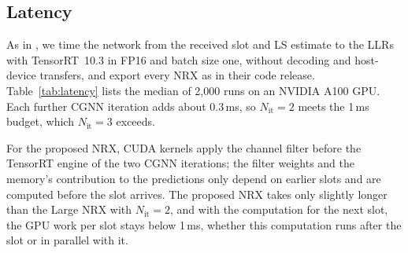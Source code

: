 \subsection{Latency}
As in \citet{wiesmayr2025realtime}, we time the network from the received slot and LS estimate to the LLRs with TensorRT~10.3 in FP16 and batch size one, without decoding and host-device transfers, and export every NRX as in their code release. Table~\ref{tab:latency} lists the median of 2{,}000 runs on an NVIDIA A100 GPU. Each further CGNN iteration adds about 0.3\,ms, so $N_{\mathrm{it}}=2$ meets the 1\,ms budget, which $N_{\mathrm{it}}=3$ exceeds.

\begin{table}[t]
\centering
\caption{Median latency [ms] with TensorRT on an NVIDIA A100 GPU. Proposed NRX: the slot, the computation before it, and the slot followed by (Seq.) or in parallel with (Par.) the next slot's computation.}
\label{tab:latency}
\scriptsize

\end{table}

For the proposed NRX, CUDA kernels apply the channel filter before the TensorRT engine of the two CGNN iterations; the filter weights and the memory's contribution to the predictions only depend on earlier slots and are computed before the slot arrives. The proposed NRX takes only slightly longer than the Large NRX with $N_{\mathrm{it}}=2$, and with the computation for the next slot, the GPU work per slot stays below 1\,ms, whether this computation runs after the slot or in parallel with it.
